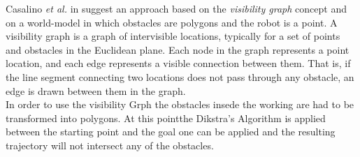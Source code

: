 \documentclass[journal]{IEEEtran}
\begin{document}
  \indent Casalino \textit{et al.} in \cite{Casalino2009} suggest an approach based on the \textit{visibility graph} concept and on a world-model in which obstacles are polygons and the robot is a point. A visibility graph is a graph of intervisible locations, typically for a set of points and obstacles in the Euclidean plane. Each node in the graph represents a point location, and each edge represents a visible connection between them. That is, if the line segment connecting two locations does not pass through any obstacle, an edge is drawn between them in the graph.\\
  In order to use the visibility Grph the obstacles insede the working are had to be transformed into polygons. At this pointthe Dikstra's Algorithm is applied between the starting point and the goal one can be applied and the resulting trajectory will not intersect any of the obstacles.
\end{document}
